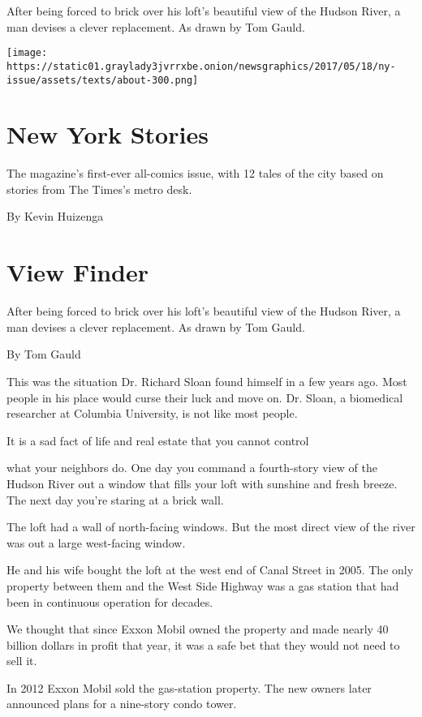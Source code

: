 After being forced to brick over his loft's beautiful view of the Hudson
River, a man devises a clever replacement. As drawn by Tom Gauld.

\texttt{[image: https://static01.graylady3jvrrxbe.onion/newsgraphics/2017/05/18/ny-issue/assets/texts/about-300.png]}

\hypertarget{new-york-stories}{%
\section{New York Stories}\label{new-york-stories}}

The magazine's first-ever all-comics issue, with 12 tales of the city
based on stories from The Times's metro desk.

By Kevin Huizenga

\hypertarget{view-finder-1}{%
\section{View Finder}\label{view-finder-1}}

After being forced to brick over his loft's beautiful view of the Hudson
River, a man devises a clever replacement. As drawn by Tom Gauld.

By Tom Gauld

This was the situation Dr. Richard Sloan found himself in a few years
ago. Most people in his place would curse their luck and move on. Dr.
Sloan, a biomedical researcher at Columbia University, is not like most
people.

It is a sad fact of life and real estate that you cannot control

what your neighbors do. One day you command a fourth-story view of the
Hudson River out a window that fills your loft with sunshine and fresh
breeze. The next day you're staring at a brick wall.

The loft had a wall of north-facing windows. But the most direct view of
the river was out a large west-facing window.

He and his wife bought the loft at the west end of Canal Street in 2005.
The only property between them and the West Side Highway was a gas
station that had been in continuous operation for decades.

We thought that since Exxon Mobil owned the property and made nearly 40
billion dollars in profit that year, it was a safe bet that they would
not need to sell it.

In 2012 Exxon Mobil sold the gas-station property. The new owners later
announced plans for a nine-story condo tower.

